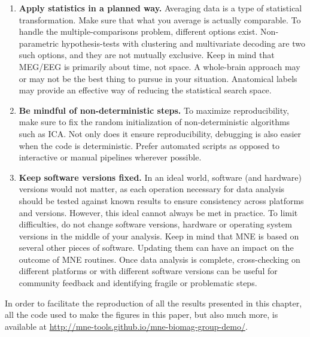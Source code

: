 \begin{enumerate}
\item \textbf{Apply statistics in a planned way.} Averaging data is a type of statistical transformation. Make sure that what you average is actually comparable. To handle the multiple-comparisons problem, different 
options exist. Non-parametric hypothesis-tests with clustering and multivariate decoding are two such options, and they are not mutually exclusive. Keep in mind that \ac{MEG}/\ac{EEG} is primarily about time, not space. A whole-brain approach may or may not be the best thing to pursue in your situation. Anatomical labels may provide an effective way of reducing the statistical search space.

\item \textbf{Be mindful of non-deterministic steps.} To maximize reproducibility, make sure to fix the random initialization of non-deterministic algorithms such as ICA. Not only does it ensure reproducibility, debugging is also easier when the code is deterministic. Prefer automated scripts as opposed to interactive or manual pipelines wherever possible.

\item \textbf{Keep software versions fixed.} In an ideal world, software (and hardware) versions would not matter, as each operation necessary for data analysis should be tested against known results to ensure consistency across platforms and versions. However, this ideal cannot always be met in practice. To limit difficulties, do not change software versions, hardware or operating system versions in the middle of your analysis. Keep in mind that MNE is based on several other pieces of software. Updating them can have an impact on the outcome of MNE routines. Once data analysis is complete, cross-checking on different platforms or with different software versions can be useful for community feedback and identifying fragile or problematic steps.

\end{enumerate}

In order to facilitate the reproduction of all the results presented in this chapter, all the code used to make the figures in this paper, but also much more, is available at \url{http://mne-tools.github.io/mne-biomag-group-demo/}.
